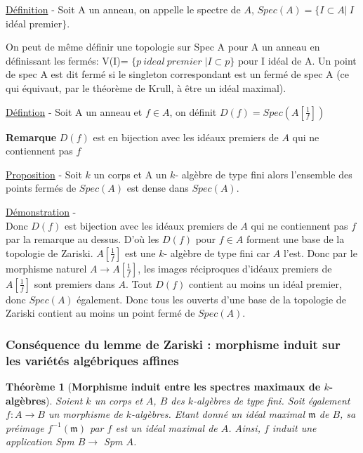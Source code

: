 \documentclass[10pt, twoside]{article}
\theoremstyle{plain}
\newtheorem{theorem}{Théorème}[section]
\theoremstyle{definition}
\theoremstyle{plain}
\theoremstyle{plain}
\theoremstyle{definition}
\theoremstyle{remark}
\begin{document}
\underline{Définition} - Soit A un anneau, on appelle le spectre de $A$, $Spec(A) = \{ I \subset A | \ I $ idéal premier$ \}$.

On peut de même définir une topologie sur Spec A pour A un anneau en définissant les fermés: V(I)= $ \{ p \ ideal \ premier \; | I \subset p \}$ pour I idéal de A. Un point de spec A  est dit fermé si le singleton correspondant est un fermé de spec A (ce qui équivaut, par le théorème de Krull, à être un idéal maximal).

\underline{Défintion} - Soit A un anneau et $f \in A$, on définit $D(f) = Spec(A[\frac{1}{f}])$

\textbf{Remarque } $D(f)$ est en bijection avec les idéaux premiers de $A$ qui ne contiennent pas $f$

\underline{Proposition} - Soit $k$ un corps et A un $k$- algèbre de type fini alors l'ensemble des points fermés de $Spec(A)$ est dense dans $Spec(A)$.

\underline{Démonstration} - \\ Donc $D(f)$ est bijection avec les idéaux premiers de $A$ qui ne contiennent pas $f$ par la remarque au dessus. D'où les $D(f)$ pour $f \in A$ forment une base  de la topologie de Zariski. $A[\frac{1}{f}]$ est une $k$- algèbre de type fini car $A$ l'est. Donc par le morphisme naturel  $ A \longrightarrow A[\frac{1}{f}] $, les images réciproques d'idéaux premiers de $A[\frac{1}{f}]$ sont premiers dans $A$. Tout $D(f)$ contient au moins un idéal premier, donc $Spec(A)$ également. Donc tous les ouverts d'une base de la topologie de Zariski contient au moins un point fermé de $Spec(A)$.

\subsubsection{Conséquence du lemme de Zariski : morphisme induit sur les variétés algébriques affines}


\begin{theorem}[\textbf{Morphisme induit entre les spectres maximaux de $k$-algèbres}]\label{thm:morph induit Spm k-alg}
    Soient $k$ un corps et $A$, $B$ des $k$-algèbres de type fini. Soit également $f : A \longrightarrow B$ un morphisme de $k$-algèbres. Etant donné un idéal maximal $\mathfrak{m}$ de $B$, sa préimage $f^{-1}(\mathfrak{m})$ par $f$ est un idéal maximal de $A$. Ainsi, $f$ induit une application Spm $B \longrightarrow$ Spm $A$.   
\end{theorem}
\end{document}
